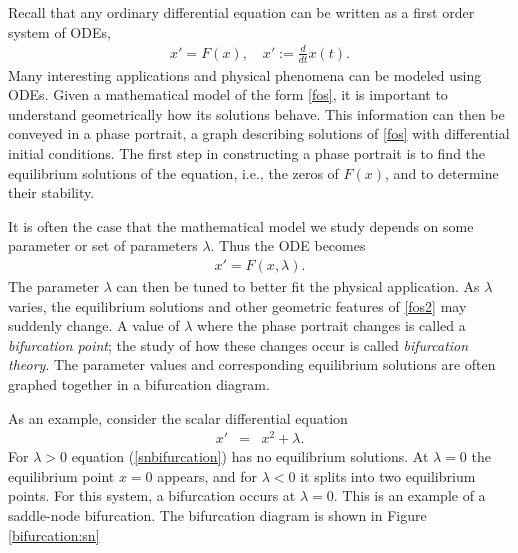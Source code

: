 \label{lab:Bifurcations}

Recall that any ordinary differential equation can be written as a first order system of ODEs,
\begin{align}
x' = F(x), \quad x' := \frac{d}{dt}x(t).\label{fos}
\end{align}
Many interesting applications and physical phenomena can be modeled using ODEs.
Given a mathematical model of the form \eqref{fos}, it is important to understand geometrically how its solutions behave.
This information can then be conveyed in a phase portrait, a graph describing solutions of \eqref{fos} with differential initial conditions.
The first step in constructing a phase portrait is to find the equilibrium solutions of the equation, i.e., the zeros of $F(x)$, and to determine their stability.

It is often the case that the mathematical model we study depends on some parameter or set of parameters $\lambda$.
Thus the ODE becomes
\begin{align}
x' = F(x,\lambda).\label{fos2}
\end{align}
The parameter $\lambda$ can then be tuned to better fit the physical application.
As $\lambda$ varies, the equilibrium solutions and other geometric features of \eqref{fos2} may suddenly change.
A value of $\lambda$ where the phase portrait changes is called a \emph{bifurcation point}; the study of how these changes occur is called \emph{bifurcation theory}.
The parameter values and corresponding equilibrium solutions are often graphed together in a bifurcation diagram.

As an example, consider the scalar differential equation
\begin{eqnarray}
x' &=& x^2 + \lambda. \label{snbifurcation}
\end{eqnarray}
For $\lambda > 0$ equation (\ref{snbifurcation}) has no equilibrium solutions.
At $\lambda = 0$ the equilibrium point $x=0$ appears, and for $\lambda < 0$ it splits into two equilibrium points.
For this system, a bifurcation occurs at $\lambda = 0$.
This is an example of a saddle-node bifurcation.
The bifurcation diagram is shown in Figure \ref{bifurcation:sn}

